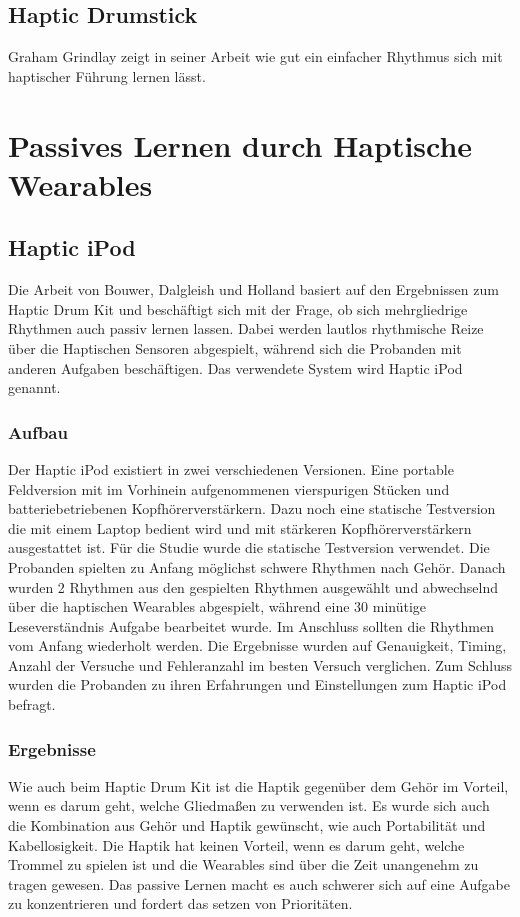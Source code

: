 \documentclass[ngerman,runningheads,a4paper]{llncs}
\begin{document}
\subsection{Haptic Drumstick}
Graham Grindlay \cite{4479984} zeigt in seiner Arbeit wie gut ein einfacher Rhythmus sich mit haptischer Führung lernen lässt.


\section{Passives Lernen durch Haptische Wearables}

\subsection{Haptic iPod}
Die Arbeit von Bouwer, Dalgleish und Holland\cite{bouwer2011haptic} basiert auf den Ergebnissen zum Haptic Drum Kit \cite{10.1145/1709886.1709892} und beschäftigt sich mit der Frage, ob sich mehrgliedrige Rhythmen auch passiv lernen lassen.
Dabei werden lautlos rhythmische Reize über die Haptischen Sensoren abgespielt, während sich die Probanden mit anderen Aufgaben beschäftigen.
Das verwendete System wird Haptic iPod genannt.
\subsubsection{Aufbau}
Der Haptic iPod existiert in zwei verschiedenen Versionen.
Eine portable Feldversion mit im Vorhinein aufgenommenen vierspurigen Stücken und batteriebetriebenen Kopfhörerverstärkern.
Dazu noch eine statische Testversion die mit einem Laptop bedient wird und mit stärkeren Kopfhörerverstärkern ausgestattet ist.
Für die Studie wurde die statische Testversion verwendet.
Die Probanden spielten zu Anfang möglichst schwere Rhythmen nach Gehör.
Danach wurden 2 Rhythmen aus den gespielten Rhythmen ausgewählt und abwechselnd über die haptischen Wearables abgespielt, während eine 30 minütige Leseverständnis Aufgabe bearbeitet wurde.
Im Anschluss sollten die Rhythmen vom Anfang wiederholt werden.
Die Ergebnisse wurden auf Genauigkeit, Timing, Anzahl der Versuche und Fehleranzahl im besten Versuch verglichen.
Zum Schluss wurden die Probanden zu ihren Erfahrungen und Einstellungen zum Haptic iPod befragt.

\subsubsection{Ergebnisse}
Wie auch beim Haptic Drum Kit \cite{10.1145/1709886.1709892} ist die Haptik gegenüber dem Gehör im Vorteil, wenn es darum geht, welche Gliedmaßen zu verwenden ist.
Es wurde sich auch die Kombination aus Gehör und Haptik gewünscht, wie auch Portabilität und Kabellosigkeit.
Die Haptik hat keinen Vorteil, wenn es darum geht, welche Trommel zu spielen ist und die Wearables sind über die Zeit unangenehm zu tragen gewesen.
Das passive Lernen macht es auch schwerer sich auf eine Aufgabe zu konzentrieren und fordert das setzen von Prioritäten.
\end{document}
